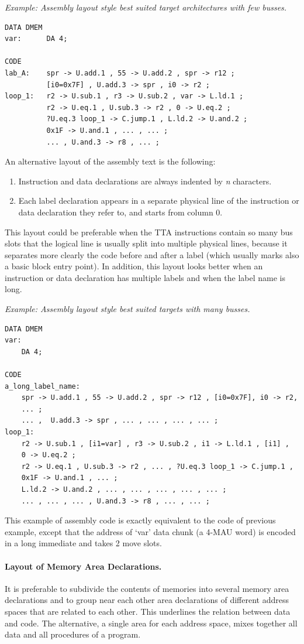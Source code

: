\documentclass[a4paper,twoside]{tceusermanual}
\begin{document}
\emph{Example: Assembly layout style best suited target architectures with
few busses.}
\begin{verbatim}
DATA DMEM
var:      DA 4;

CODE
lab_A:    spr -> U.add.1 , 55 -> U.add.2 , spr -> r12 ;
          [i0=0x7F] , U.add.3 -> spr , i0 -> r2 ;
loop_1:   r2 -> U.sub.1 , r3 -> U.sub.2 , var -> L.ld.1 ;
          r2 -> U.eq.1 , U.sub.3 -> r2 , 0 -> U.eq.2 ;
          ?U.eq.3 loop_1 -> C.jump.1 , L.ld.2 -> U.and.2 ;
          0x1F -> U.and.1 , ... , ... ;
          ... , U.and.3 -> r8 , ... ;
\end{verbatim}

An alternative layout of the assembly text is the following:
\begin{enumerate}
\item %
  Instruction and data declarations are always indented by \emph{n}
  characters.
\item %
  Each label declaration appears in a separate physical line of the
  instruction or data declaration they refer to, and starts from column 0.
\end{enumerate}
This layout could be preferable when the TTA instructions contain so many
bus slots that the logical line is usually split into multiple physical
lines,
because it separates more clearly the code before and after a label (which
usually marks also a basic block entry point).  In addition, this layout
looks better when an instruction or data declaration has multiple labels and
when the label name is long.

\emph{Example: Assembly layout style best suited targets with many busses.}
\begin{verbatim}
DATA DMEM
var:
    DA 4;

CODE
a_long_label_name:
    spr -> U.add.1 , 55 -> U.add.2 , spr -> r12 , [i0=0x7F], i0 -> r2,
    ... ;
    ... ,  U.add.3 -> spr , ... , ... , ... , ... ;
loop_1:
    r2 -> U.sub.1 , [i1=var] , r3 -> U.sub.2 , i1 -> L.ld.1 , [i1] ,
    0 -> U.eq.2 ;
    r2 -> U.eq.1 , U.sub.3 -> r2 , ... , ?U.eq.3 loop_1 -> C.jump.1 ,
    0x1F -> U.and.1 , ... ;
    L.ld.2 -> U.and.2 , ... , ... , ... , ... , ... ;
    ... , ... , ... , U.and.3 -> r8 , ... , ... ;
\end{verbatim}
This example of assembly code is exactly equivalent to the code of previous
example, except that the address of `var' data chunk (a 4-MAU word) is
encoded in a long immediate and takes 2 move slots.

\paragraph{Layout of Memory Area Declarations.}
It is preferable to subdivide the contents of memories into several memory
area declarations and to group near each other area declarations of
different address spaces that are related to each other.  This underlines
the relation between data and code.
%
The alternative, a single area for each address space, mixes together all
data and all procedures of a program.
\end{document}
